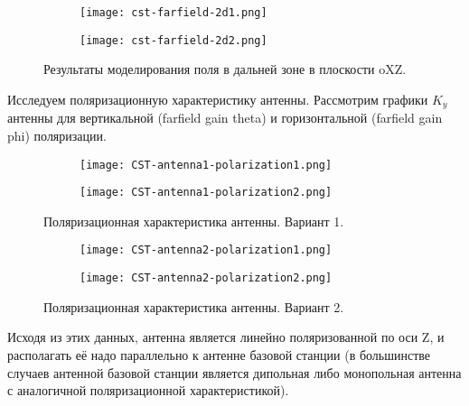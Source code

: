 \begin{figure}[H]
	\centering
	\begin{subfigure}[t]{0.49\textwidth}
		\centering
		\texttt{[image: cst-farfield-2d1.png]}
		\caption{}%
		\label{}
	\end{subfigure}
	\hfill
	\begin{subfigure}[t]{0.49\textwidth}
		\centering
		\texttt{[image: cst-farfield-2d2.png]}
		\caption{}%
		\label{}
	\end{subfigure}
	\caption{Результаты моделирования поля в дальней зоне в плоскости oXZ.}
	\label{fig:cst-farfield-2d}
\end{figure}

Исследуем поляризационную характеристику антенны. Рассмотрим графики $K_y$ антенны для вертикальной (farfield gain theta) и горизонтальной \linebreak(farfield gain phi) поляризации. 

\begin{figure}[H]
	\centering
	\begin{subfigure}[t]{0.49\textwidth}
		\centering
		\texttt{[image: CST-antenna1-polarization1.png]}
		\caption{}%
		\label{}
	\end{subfigure}
	\hfill
	\begin{subfigure}[t]{0.49\textwidth}
		\centering
		\texttt{[image: CST-antenna1-polarization2.png]}
		\caption{}%
		\label{}
	\end{subfigure}
	\caption{Поляризационная характеристика антенны. Вариант 1.}
	\label{fig:CST-antenna1-polarization}
\end{figure}

\begin{figure}[H]
	\centering
	\begin{subfigure}[t]{0.49\textwidth}
		\centering
		\texttt{[image: CST-antenna2-polarization1.png]}
		\caption{}%
		\label{}
	\end{subfigure}
	\hfill
	\begin{subfigure}[t]{0.49\textwidth}
		\centering
		\texttt{[image: CST-antenna2-polarization2.png]}
		\caption{}%
		\label{}
	\end{subfigure}
	\caption{Поляризационная характеристика антенны. Вариант 2.}
	\label{fig:CST-antenna2-polarization}
\end{figure}

Исходя из этих данных, антенна является линейно поляризованной по оси Z, и располагать её надо параллельно к антенне базовой станции (в большинстве случаев антенной базовой станции является дипольная либо монопольная антенна с аналогичной поляризационной характеристикой).
